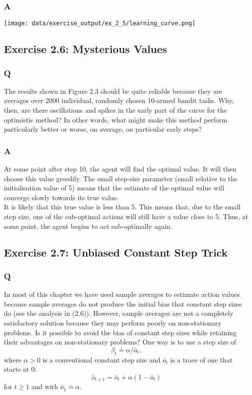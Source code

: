 \subsubsection{A}
\ProgrammingExercise

\texttt{[image: data/exercise\_output/ex\_2\_5/learning\_curve.png]}


\subsection{Exercise 2.6: Mysterious Values}
\subsubsection{Q}
The results shown in Figure 2.3 should be quite reliable because they are averages over 2000 individual, randomly chosen 10-armed bandit tasks. Why, then, are there oscillations and spikes in the early part of the curve for the optimistic method? In other words, what might make this method perform particularly better or worse, on average, on particular early steps?

\subsubsection{A}
At some point after step 10, the agent will find the optimal value. It will then choose this value greedily. The small step-size parameter (small relative to the initialisation value of 5) means that the estimate of the optimal value will converge slowly towards its true value.\\

It is likely that this true value is less than 5. This means that, due to the small step size, one of the sub-optimal actions will still have a value close to 5. Thus, at some point, the agent begins to act sub-optimally again.

\subsection{Exercise 2.7: Unbiased Constant Step Trick}
\subsubsection{Q}
In most of this chapter we have used sample averages to estimate action values because sample averages do not produce the initial bias that constant step sizes do (see the analysis in (2.6)). However, sample averages are not a completely satisfactory solution because they may perform poorly on non-stationary problems. Is it possible to avoid the bias of constant step sizes while retaining their advantages on non-stationary problems? One way is to use a step size of
\begin{equation}
    \beta_t \doteq \alpha / \bar{o}_t,
\end{equation}
where $\alpha > 0$ is a conventional constant step size and $\bar{o}_t$ is a trace of one that starts at 0:
\begin{equation}
    \bar{o}_{t+1} = \bar{o}_t + \alpha (1 - \bar{o}_t)
\end{equation}
for $t \geq 1$ and with $\bar{o}_1 \doteq \alpha$.\\

